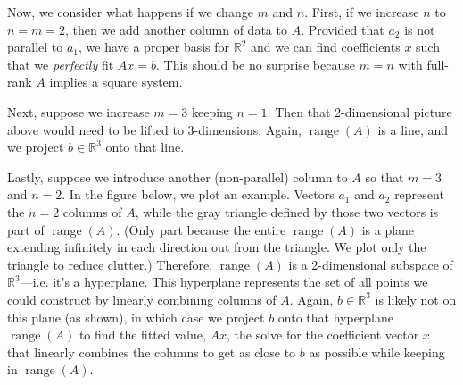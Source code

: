 \documentclass[12pt]{article}
\numberwithin{equation}{section} %
\theoremstyle{plain}
\theoremstyle{definition}
\theoremstyle{remark}
\newcommand{\R}{\mathbb{R}}
\newcommand{\range}{\operatorname{range}}
\begin{document}
\clearpage
Now, we consider what happens if we change $m$ and $n$. First, if we
increase $n$ to $n=m=2$, then we add another column of data to $A$.
Provided that $a_2$ is not parallel to $a_1$, we have a proper basis for
$\R^2$ and we can find coefficients $x$ such that we \emph{perfectly}
fit $Ax=b$. This should be no surprise because $m=n$ with full-rank $A$
implies a square system.

Next, suppose we increase $m=3$ keeping $n=1$. Then that 2-dimensional
picture above would need to be lifted to 3-dimensions. Again,
$\range(A)$ is a line, and we project $b\in\R^3$ onto that line.

Lastly, suppose we introduce another (non-parallel) column to $A$ so
that $m=3$ and $n=2$. In the figure below, we plot an example.
Vectors $a_1$ and $a_2$ represent the $n=2$ columns of $A$, while the
gray triangle defined by those two vectors is part of $\range(A)$.
(Only part because the entire $\range(A)$ is a plane extending
infinitely in each direction out from the triangle. We plot only the
triangle to reduce clutter.)
Therefore, $\range(A)$ is a 2-dimensional subspace of $\R^3$---i.e. it's
a hyperplane. This hyperplane represents the set of all points we could
construct by linearly combining columns of $A$.  Again, $b\in\R^3$ is
likely not on this plane (as shown), in which case we project $b$ onto
that hyperplane $\range(A)$ to find the fitted value, $Ax$, the solve
for the coefficient vector $x$ that linearly combines the columns to get
as close to $b$ as possible while keeping in $\range(A)$.
\end{document}
